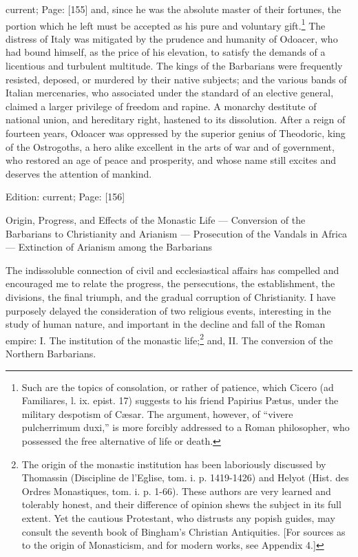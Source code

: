 current; Page: [155] and, since he was the absolute master of their fortunes, the portion which he left must be accepted as his pure and voluntary gift.\footnote{Such are the topics of consolation, or rather of patience, which Cicero (ad Familiares, l. ix. epist. 17) suggests to his friend Papirius Pætus, under the military despotism of Cæsar. The argument, however, of \texthebrew{“}vivere pulcherrimum duxi,\texthebrew{}” is more forcibly addressed to a Roman philosopher, who possessed the free alternative of life or death.} The distress of Italy was mitigated by the prudence and humanity of Odoacer, who had bound himself, as the price of his elevation, to satisfy the demands of a licentious and turbulent multitude. The kings of the Barbarians were frequently resisted, deposed, or murdered by their native subjects; and the various bands of Italian mercenaries, who associated under the standard of an elective general, claimed a larger privilege of freedom and rapine. A monarchy destitute of national union, and hereditary right, hastened to its dissolution. After a reign of fourteen years, Odoacer was oppressed by the superior genius of Theodoric, king of the Ostrogoths, a hero alike excellent in the arts of war and of government, who restored an age of peace and prosperity, and whose name still excites and deserves the attention of mankind.

Edition: current; Page: [156]


Origin, Progress, and Effects of the Monastic Life \texthebrew{—} Conversion of the Barbarians to Christianity and Arianism \texthebrew{—} Prosecution of the Vandals in Africa \texthebrew{—} Extinction of Arianism among the Barbarians

The indissoluble connection of civil and ecclesiastical affairs has compelled and encouraged me to relate the progress, the persecutions, the establishment, the divisions, the final triumph, and the gradual corruption of Christianity. I have purposely delayed the consideration of two religious events, interesting in the study of human nature, and important in the decline and fall of the Roman empire: I. The institution of the monastic life;\footnote{The origin of the monastic institution has been laboriously discussed by Thomassin (Discipline de l\texthebrew{}’Eglise, tom. i. p. 1419-1426) and Helyot (Hist. des Ordres Monastiques, tom. i. p. 1-66). These authors are very learned and tolerably honest, and their difference of opinion shews the subject in its full extent. Yet the cautious Protestant, who distrusts any popish guides, may consult the seventh book of Bingham\texthebrew{}’s Christian Antiquities. [For sources as to the origin of Monasticism, and for modern works, see Appendix 4.]} and, II. The conversion of the Northern Barbarians.

